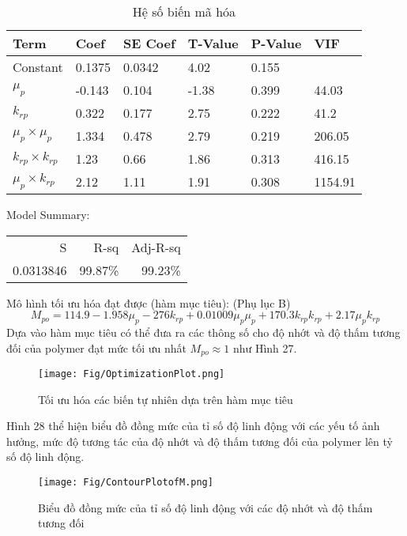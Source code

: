\documentclass[12pt,a4paper]{article}
\begin{document}
	
\begin{table}[h]
\centering
\caption{Hệ số biến mã hóa}
\label{my-label}
\begin{tabularx}{\textwidth}{@{}XXXXXX@{}}
\toprule
Term                                                                  & Coef   & SE Coef & T-Value & P-Value & VIF     \\ \midrule
Constant                                                              & 0.1375 & 0.0342  & 4.02    & 0.155   &         \\
$\mu_p$                                                               & -0.143 & 0.104   & -1.38   & 0.399   & 44.03   \\
$k_{rp}$                                                              & 0.322  & 0.177   & 2.75    & 0.222   & 41.2    \\
$\mu_p\times{\mu_p}$ & 1.334  & 0.478   & 2.79    & 0.219   & 206.05  \\
$k_{rp}\times{k_{rp}}$                                                & 1.23   & 0.66    & 1.86    & 0.313   & 416.15  \\
$\mu_p\times{k_{rp}}$                                                 & 2.12   & 1.11    & 1.91    & 0.308   & 1154.91 \\ \bottomrule
\end{tabularx}
\end{table}
\newpage
\noindent
Model Summary:
\begin{table}[h]
\begin{flushleft}
\label{my-label}
\begin{tabular}{rrr}
S         & R-sq    & Adj-R-sq \\
0.0313846 & 99.87\% & 99.23\%
\end{tabular}
\end{flushleft}
\end{table}
\newpage
\noindent
Mô hình tối ưu hóa đạt được (hàm mục tiêu): (Phụ lục B)
	\begin{equation}
		M_{po}=114.9-1.958\mu_p-276k_{rp}+0.01009\mu_p\mu_p+170.3k_{rp}k_{rp}+2.17\mu_pk_{rp}
	\end{equation}
	Dựa vào hàm mục tiêu có thể đưa ra các thông số cho độ nhớt và độ thấm tương đối của polymer đạt mức tối ưu nhất $M_{po}\approx1$ như Hình 27.
		\begin{figure}[h]
			\centering
			\texttt{[image: Fig/OptimizationPlot.png]}
			\caption{Tối ưu hóa các biến tự nhiên dựa trên hàm mục tiêu}
		\end{figure}
	\newpage
	\noindent
	Hình 28 thể hiện biểu đồ đồng mức của tỉ số độ linh động với các yếu tố ảnh hưởng, mức độ tương tác của độ nhớt và độ thấm tương đối của polymer lên tỷ số độ linh động.
		\begin{figure}[h]
			\centering
			\texttt{[image: Fig/ContourPlotofM.png]}
			\caption{Biểu đồ đồng mức của tỉ số độ linh động với các độ nhớt và độ thấm tương đối}
		\end{figure}
\clearpage
\end{document}
